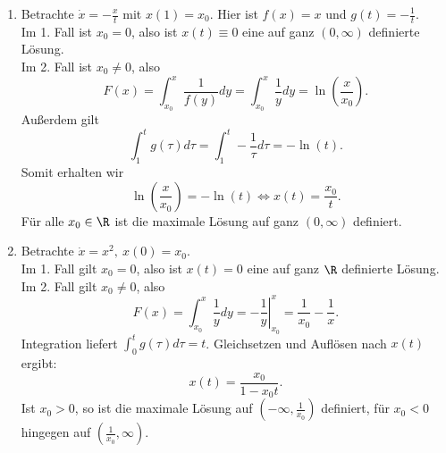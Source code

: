 \begin{beispiele}
\begin{enumerate}
\item Betrachte $\dot{x} = - \frac{x}{t}$ mit $x(1)=x_0$. Hier ist $f(x) = x$ und $g(t)=- \frac{1}{t}$.\\
Im 1. Fall ist $x_0=0$, also ist $x(t) \equiv 0$ eine auf ganz $(0, \infty)$ definierte Lösung.\\
Im 2. Fall ist $x_0 \neq 0$, also
\begin{equation}
F(x) = \int_{x_0}^x \frac{1}{f(y)} dy = \int_{x_0}^x \frac{1}{y} dy = \ln \left( \frac{x}{x_0} \right).
\end{equation}
Außerdem gilt
\begin{equation}
\int_1^t g(\tau) d \tau = \int_1^t - \frac{1}{\tau} d\tau = - \ln (t).
\end{equation}
Somit erhalten wir
\begin{equation}
\ln \left( \frac{x}{x_0} \right) = - \ln (t) \iff x(t) = \frac{x_0}{t}.
\end{equation}
Für alle $x_0 \in \R$ ist die maximale Lösung auf ganz $(0, \infty)$ definiert.
\item Betrachte $\dot{x} = x^2, \ x(0)=x_0$.\\
Im 1. Fall gilt $x_0=0$, also ist $x(t)=0$ eine auf ganz $\R$ definierte Lösung.\\
Im 2. Fall gilt $x_0 \neq 0$, also 
\begin{equation}
F(x) = \int_{x_0}^x \frac{1}{y} dy = - \left.\frac{1}{y} \right|_{x_0}^x = \frac{1}{x_0}- \frac{1}{x}.
\end{equation}
Integration liefert $\int_0^t g(\tau) d\tau = t$. Gleichsetzen und Auflösen nach $x(t)$ ergibt:
\begin{equation}
x(t) = \frac{x_0}{1-x_0t}.
\end{equation}
Ist $x_0>0$, so ist die maximale Lösung auf $(-\infty, \frac{1}{x_0})$ definiert, für $x_0<0$ hingegen auf $(\frac{1}{x_0}, \infty)$.
\end{enumerate}
\end{beispiele}
